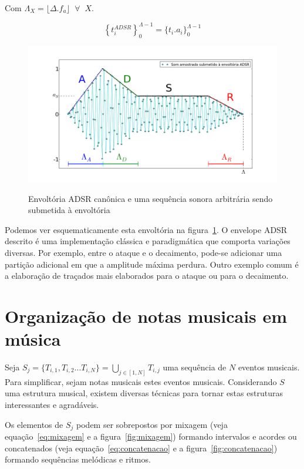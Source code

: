 Com $\Lambda_X=\lfloor \Delta . f_a \rfloor\;\;\forall\;\; X$.

\begin{equation}
\left\{t_i^{ADSR}\right\}_0^{\Lambda-1} =\{t_i . a_i\}_0^{\Lambda-1}
\end{equation}

\begin{figure}[htpq!]
    \centering
    \caption{Envoltória ADSR canônica e uma sequência sonora arbitrária sendo submetida à envoltória}
        \includegraphics[width=\textwidth]{figuras/adsr}
        \label{fig:adsr}
\end{figure}


Podemos ver esquematicamente esta envoltória na figura~\ref{fig:adsr}. O envelope ADSR descrito é
uma implementação clássica e paradigmática que comporta variações diversas. Por exemplo,
entre o ataque e o decaimento, pode-se adicionar uma partição adicional em que a amplitude
máxima perdura. Outro exemplo comum é a elaboração de traçados mais elaborados para o
ataque ou para o decaimento.



\clearpage
\section{Organização de notas musicais em música}\label{notasMusica}
Seja $ S_j=\{T_{i,1},T_{i,2}...T_{i,N}\} =\bigcup_{j \in [1,N]} T_{i,j} $ uma sequência de $N$ eventos
musicais. Para simplificar, sejam notas musicais estes eventos musicais.
Considerando $S$ uma estrutura musical, existem diversas técnicas
para tornar estas estruturas interessantes e agradáveis. 	

Os elementos de $S_j$ podem ser sobrepostos por mixagem (veja equação~\ref{eq:mixagem} e a figura~\ref{fig:mixagem}) formando intervalos e acordes ou concatenados (veja equação~\ref{eq:concatenacao} e a figura~\ref{fig:concatenacao}) formando sequências melódicas e ritmos.

